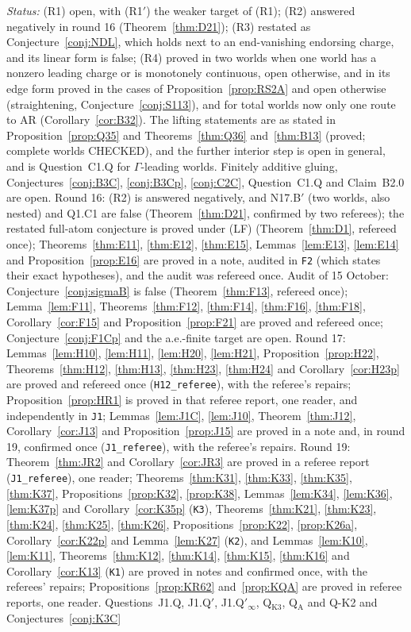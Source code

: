 \documentclass[11pt]{article}
\theoremstyle{definition}
\theoremstyle{remark}
\newcommand{\src}[1]{\texttt{#1}}
\begin{document}
\emph{Status:} (R1) open, with (R1$'$) the weaker target of (R1); (R2) answered negatively in round 16 (Theorem~\ref{thm:D21}); (R3) restated as Conjecture~\ref{conj:NDL}, which holds next to an end-vanishing endorsing charge, and its linear form is false; (R4) proved in two worlds when one world has a nonzero leading charge or is monotonely continuous, open otherwise, and in its edge form proved in the cases of Proposition~\ref{prop:RS2A} and open otherwise (straightening, Conjecture~\ref{conj:S113}), and for total worlds now only one route to AR (Corollary~\ref{cor:B32}). The lifting statements are as stated in Proposition~\ref{prop:Q35} and Theorems~\ref{thm:Q36} and~\ref{thm:B13} (proved; complete worlds CHECKED), and the further interior step is open in general, and is Question~C1.Q for $\Gamma$-leading worlds. Finitely additive gluing, Conjectures~\ref{conj:B3C}, \ref{conj:B3Cp}, \ref{conj:C2C}, Question~C1.Q and Claim~B2.0 are open. Round 16: (R2) is answered negatively, and N17.B$'$ (two worlds, also nested) and Q1.C1 are false (Theorem~\ref{thm:D21}, confirmed by two referees); the restated full-atom conjecture is proved under (LF) (Theorem~\ref{thm:D1}, refereed once); Theorems~\ref{thm:E11}, \ref{thm:E12}, \ref{thm:E15}, Lemmas~\ref{lem:E13}, \ref{lem:E14} and Proposition~\ref{prop:E16} are proved in a note, audited in \src{F2} (which states their exact hypotheses), and the audit was refereed once. Audit of 15 October: Conjecture~\ref{conj:sigmaB} is false (Theorem~\ref{thm:F13}, refereed once); Lemma~\ref{lem:F11}, Theorems~\ref{thm:F12}, \ref{thm:F14}, \ref{thm:F16}, \ref{thm:F18}, Corollary~\ref{cor:F15} and Proposition~\ref{prop:F21} are proved and refereed once; Conjecture~\ref{conj:F1Cp} and the a.e.-finite target are open. Round 17: Lemmas~\ref{lem:H10}, \ref{lem:H11}, \ref{lem:H20}, \ref{lem:H21}, Proposition~\ref{prop:H22}, Theorems~\ref{thm:H12}, \ref{thm:H13}, \ref{thm:H23}, \ref{thm:H24} and Corollary~\ref{cor:H23p} are proved and refereed once (\src{H12\_referee}), with the referee's repairs; Proposition~\ref{prop:HR1} is proved in that referee report, one reader, and independently in \src{J1}; Lemmas~\ref{lem:J1C}, \ref{lem:J10}, Theorem~\ref{thm:J12}, Corollary~\ref{cor:J13} and Proposition~\ref{prop:J15} are proved in a note and, in round 19, confirmed once (\src{J1\_referee}), with the referee's repairs. Round 19: Theorem~\ref{thm:JR2} and Corollary~\ref{cor:JR3} are proved in a referee report (\src{J1\_referee}), one reader; Theorems~\ref{thm:K31}, \ref{thm:K33}, \ref{thm:K35}, \ref{thm:K37}, Propositions~\ref{prop:K32}, \ref{prop:K38}, Lemmas~\ref{lem:K34}, \ref{lem:K36}, \ref{lem:K37p} and Corollary~\ref{cor:K35p} (\src{K3}), Theorems~\ref{thm:K21}, \ref{thm:K23}, \ref{thm:K24}, \ref{thm:K25}, \ref{thm:K26}, Propositions~\ref{prop:K22}, \ref{prop:K26a}, Corollary~\ref{cor:K22p} and Lemma~\ref{lem:K27} (\src{K2}), and Lemmas~\ref{lem:K10}, \ref{lem:K11}, Theorems~\ref{thm:K12}, \ref{thm:K14}, \ref{thm:K15}, \ref{thm:K16} and Corollary~\ref{cor:K13} (\src{K1}) are proved in notes and confirmed once, with the referees' repairs; Propositions~\ref{prop:KR62} and~\ref{prop:KQA} are proved in referee reports, one reader. Questions~J1.Q, J1.Q$'$, J1.Q$'_\infty$, Q$_{\mathrm{K3}}$, Q$_{\mathrm A}$ and Q-K2 and Conjectures~\ref{conj:K3C} 
\end{document}

